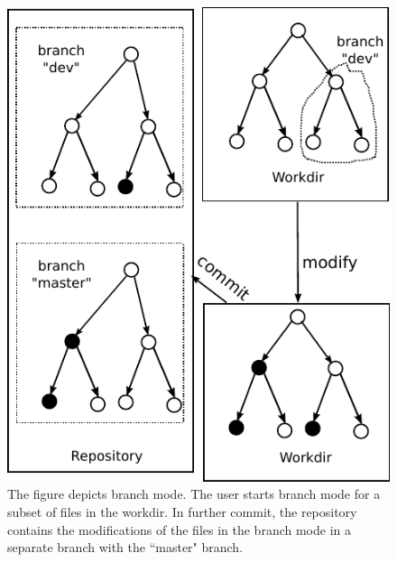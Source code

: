 \begin{figure}[t]
\centerline{\includegraphics{fig/branchmode.pdf}}
\caption{The figure depicts branch mode.
The user starts branch mode
for a subset of files in the workdir. In further commit, the repository contains
the modifications of the files in the branch mode in a separate branch with the
``master" branch.
}

\label{f:branch}
\end{figure}

\endinput


